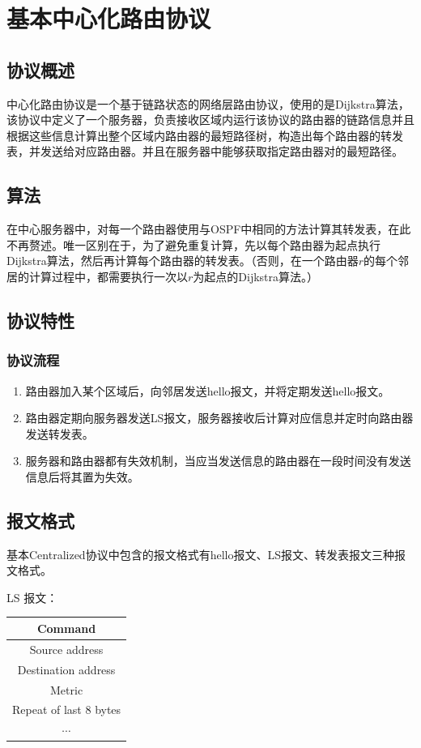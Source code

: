 \section{基本中心化路由协议}
\subsection{协议概述} %
	\label{sub:协议概述}
		中心化路由协议是一个基于链路状态的网络层路由协议，使用的是Dijkstra算法，该协议中定义了一个服务器，负责接收区域内运行该协议的路由器的链路信息并且根据这些信息计算出整个区域内路由器的最短路径树，构造出每个路由器的转发表，并发送给对应路由器。并且在服务器中能够获取指定路由器对的最短路径。
	\subsection{算法} %
	\label{sub:算法}
		在中心服务器中，对每一个路由器使用与OSPF中相同的方法计算其转发表，在此不再赘述。唯一区别在于，为了避免重复计算，先以每个路由器为起点执行Dijkstra算法，然后再计算每个路由器的转发表。（否则，在一个路由器$r$的每个邻居的计算过程中，都需要执行一次以$r$为起点的Dijkstra算法。）
	\subsection{协议特性} %
	\label{sub:协议特性}
		\subsubsection{协议流程} %
		\label{ssub:协议流程}
			\begin{enumerate}
				\item 路由器加入某个区域后，向邻居发送hello报文，并将定期发送hello报文。
				\item 路由器定期向服务器发送LS报文，服务器接收后计算对应信息并定时向路由器发送转发表。
				\item 服务器和路由器都有失效机制，当应当发送信息的路由器在一段时间没有发送信息后将其置为失效。
			\end{enumerate}
	\subsection{报文格式} %
	\label{sub:报文格式}
		基本Centralized协议中包含的报文格式有hello报文、LS报文、转发表报文三种报文格式。
		\par LS 报文：
		\begin{table}[H]
		\centering
			\begin{tabular}{|c|}
				\hline
				Command \\
				\hline
				Source address \\
				\hline
				Destination address \\
				\hline
				Metric \\
				\hline
				Repeat of last 8 bytes \\
				\hline
				$\cdots$ \\
				\hline
			\end{tabular}		
		\end{table}


